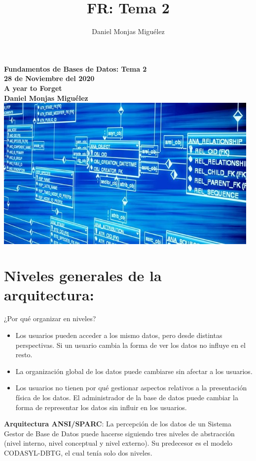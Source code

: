 \documentclass[a4paper,11pt]{article}
\author{Daniel Monjas Miguélez}
\title{FR: Tema 2}
\begin{document}
\begin{titlepage}
\centering
    \vfill
    {\bfseries\Large
        Fundamentos de Bases de Datos: Tema 2\\
        28 de Noviembre del 2020\\
        A year to Forget \\
        \vskip2cm
        Daniel Monjas Miguélez\\
    }    
    \vfill
    \includegraphics[width=13cm]{bases_datos.jpg}
    \vfill
    \vfill
\end{titlepage}

\newpage
\tableofcontents
\newpage

\section{Niveles generales de la arquitectura:}
¿Por qué organizar en niveles?

\begin{itemize}
\item Los usuarios pueden acceder a los mismo datos, pero desde distintas perspectivas. Si un usuario cambia la forma de ver los datos no influye en el resto.

\item La organización global de los datos puede cambiarse sin afectar a los usuarios.

\item Los usuarios no tienen por qué gestionar aspectos relativos a la presentación física de los datos. El administrador de la base de datos puede cambiar la forma de representar los datos sin influir en los usuarios.
\end{itemize}

\textbf{Arquitectura ANSI/SPARC}: La percepción de los datos de un Sistema Gestor de Base de Datos puede hacerse siguiendo tres niveles de abstracción (nivel interno, nivel conceptual y nivel externo). Su predecesor es el modelo CODASYL-DBTG, el cual tenía solo dos niveles. \\
\end{document}
